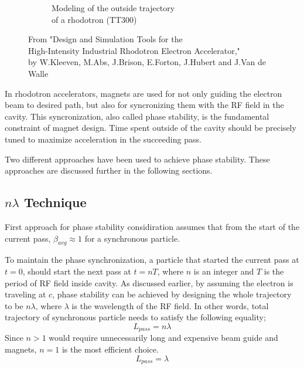 \documentclass[a4paper,oneside,12pt]{report}
\numberwithin{equation}{chapter}
\begin{document}
\begin{figure}[H]
\begin{subfigure}{.5\textwidth}
      \caption{Modeling of the outside trajectory \\ of a rhodotron (TT300) \cite{cite:rhodo_design}}
    \end{subfigure}
    \caption{From "Design and Simulation Tools for the \\ High-Intensity Industrial Rhodotron Electron Accelerator," \\by W.Kleeven, M.Abs, J.Brison, E.Forton, J.Hubert and J.Van de Walle}
    \label{fig:magnet_design_illustrations}
\end{figure}

In rhodotron accelerators, magnets are used for not only guiding the electron beam to desired path, but also for syncronizing them with the RF field in the cavity. 
This syncronization, also called phase stability, is the fundamental constraint of magnet design. 
Time spent outside of the cavity should be precisely tuned to maximize acceleration in the succeeding pass. 

Two different approaches have been used to achieve phase stability.
These approaches are discussed further in the following sections.

\subsection{$n\lambda$ Technique} \label{sec:n_L_technique}

First approach for phase stability considiration assumes that from the start of the current pass, $\beta_{avg} \approx 1$ for a synchronous particle. 

To maintain the phase synchronization, a particle that started the current pass at $t=0$, should start the next pass at $t=nT$, where $n$ is an integer and $T$ is the period of RF field inside cavity.
As discussed earlier, by assuming the electron is traveling at $c$, phase stability can be achieved by designing the whole trajectory to be $n \lambda$, where $\lambda$ is the wavelength of the RF field. 
In other words, total trajectory of synchronous particle needs to satisfy the following equality;
\begin{equation*}
    L_{pass} = n \lambda
\end{equation*} 
Since $n>1$ would require unnecessarily long and expensive beam guide and magnets, $n=1$ is the most efficient choice.
\begin{equation}
    L_{pass} = \lambda
\end{equation} 
\end{document}
